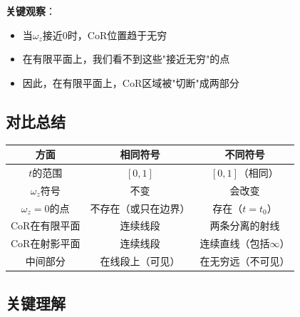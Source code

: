 \documentclass[12pt,a4paper]{article}
\begin{document}
\textbf{关键观察}：
\begin{itemize}
\item 当$\omega_z$接近0时，CoR位置趋于无穷
\item 在有限平面上，我们看不到这些"接近无穷"的点
\item 因此，在有限平面上，CoR区域被"切断"成两部分
\end{itemize}

\subsection{对比总结}

\begin{center}
\begin{tabular}{|c|c|c|}
\hline
\textbf{方面} & \textbf{相同符号} & \textbf{不同符号} \\
\hline
$t$的范围 & $[0, 1]$ & $[0, 1]$（相同） \\
\hline
$\omega_z$符号 & 不变 & 会改变 \\
\hline
$\omega_z = 0$的点 & 不存在（或只在边界） & 存在（$t = t_0$） \\
\hline
CoR在有限平面 & 连续线段 & 两条分离的射线 \\
\hline
CoR在射影平面 & 连续线段 & 连续直线（包括$\infty$） \\
\hline
中间部分 & 在线段上（可见） & 在无穷远（不可见） \\
\hline
\end{tabular}
\end{center}

\subsection{关键理解}
\end{document}
